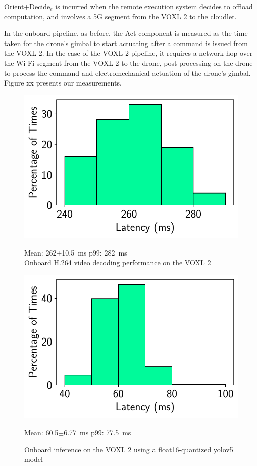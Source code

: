 Orient+Decide$_e$ is incurred when the remote execution system decides to
offload computation, and involves a 5G segment from the VOXL 2 to the cloudlet.

In the onboard pipeline, as before, the Act component is measured as the time
taken for the drone's gimbal to start actuating after a command is issued from
the VOXL 2. In the case of the VOXL 2 pipeline, it requires a network hop over
the Wi-Fi segment from the VOXL 2 to the drone, post-processing on the drone to
process the command and electromechanical actuation of the drone's gimbal.
Figure xx presents our measurements.

\begin{figure}[tbp]
\begin{minipage}[t]{0.45\textwidth}
\centerline{\includegraphics[width = \textwidth]{figs/onboard-decoding.pdf}}
\centering
Mean: 262$\pm$10.5~ms\; p99: 282~ms\\
\caption{Onboard H.264 video decoding performance on the VOXL 2}
\label{fig:voxl2-decoding-performance}
\end{minipage}
\hfill
\begin{minipage}[t]{0.45\textwidth}
\centerline{\includegraphics[width = \textwidth]{figs/onboard-inference-hist.pdf}}
\centering
Mean: 60.5$\pm$6.77~ms\; p99: 77.5~ms\\
\caption{Onboard inference on the VOXL 2 using a float16-quantized yolov5 model}
\label{fig:voxl2-inference-hist}
\end{minipage}
\end{figure}

